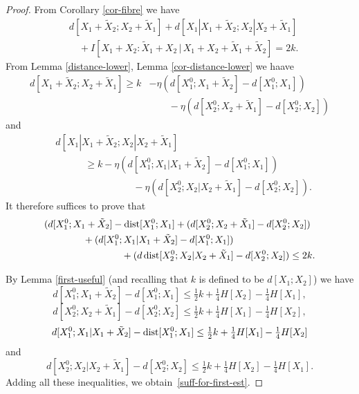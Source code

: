 \begin{proof}  From Corollary \ref{cor-fibre} we have
  \begin{align*}
    &   d[X_1+\tilde X_2;X_2+\tilde X_1] + d[X_1|X_1+\tilde X_2; X_2|X_2+\tilde X_1] \\
    &\quad + I[ X_1+ X_2 : \tilde X_1 + X_2 \,|\, X_1 + X_2 + \tilde X_1 + \tilde X_2 ] = 2k.
    \end{align*}
From Lemma \ref{distance-lower}, Lemma \ref{cor-distance-lower} we haave
\begin{align*}
  d[X_1+\tilde X_2; X_2+\tilde X_1] \geq k &- \eta (d[X^0_1; X_1+\tilde X_2] - d[X^0_1; X_1]) \\& \qquad- \eta (d[X^0_2; X_2+\tilde X_1] - d[X^0_2; X_2])
\end{align*}
and
\begin{align*}
  \nonumber
  & d[X_1|X_1+\tilde X_2; X_2|X_2+\tilde X_1]  \\ \nonumber & \qquad\quad \geq k - \eta (d[X^0_1; X_1 | X_1 + \tilde X_2] - d[X^0_1; X_1]) \\
  & \qquad\qquad\qquad\qquad  - \eta(d[X^0_2; X_2 | X_2 + \tilde X_1] - d[X^0_2; X_2]).
\end{align*}
It therefore suffices to prove that
\begin{align}
\nonumber
&(d[X_1^0;X_1+\tilde X_2]-\operatorname{dist}[X_1^0;X_1] + (d[X_2^0;X_2+\tilde X_1]-d[X_2^0;X_2])\\
&\qquad \qquad +(d[X_1^0;X_1|X_1+\tilde X_2]-d[X_1^0;X_1]) \nonumber \\ & \qquad \qquad \qquad \qquad  +(d\operatorname{dist}[X_2^0; X_2|X_2+\tilde X_1]-d[X_2^0;X_2]) \leq 2k.
\label{suff-for-first-est}
\end{align}

By Lemma \ref{first-useful} (and recalling that $k$ is defined to be $d[X_1;X_2]$) we have
\[ d[X^0_1; X_1+\tilde X_2] - d[X^0_1; X_1] \leq \tfrac{1}{2} k + \tfrac{1}{4} H[X_2] - \tfrac{1}{4} H[X_1],\] \[  d[X^0_2;X_2+\tilde X_1] - d[X^0_2; X_2] \leq \tfrac{1}{2} k + \tfrac{1}{4} H[X_1] - \tfrac{1}{4} H[X_2],\]
\begin{equation}  d[X_1^0;X_1|X_1+\tilde X_2] - \operatorname{dist}[X_1^0;X_1] \leq \tfrac{1}{2} k + \tfrac{1}{4} H[X_1] - \tfrac{1}{4} H[X_2]                                 \label{second-dist1}
\end{equation}
and
\begin{equation}
  \label{second-dist2}
  d[X_2^0; X_2|X_2+\tilde X_1] - d[X_2^0; X_2] \leq \tfrac{1}{2}k + \tfrac{1}{4} H[X_2] - \tfrac{1}{4} H[X_1].
\end{equation}
Adding all these inequalities, we obtain~\eqref{suff-for-first-est}.
\end{proof}

